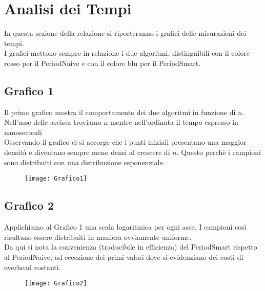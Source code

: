 \chapter{Analisi dei Tempi}
In questa sezione della relazione si riporteranno i grafici delle misurazioni dei tempi.
\\I grafici mettono sempre in relazione i due algoritmi, distinguibili con il colore rosso per il PeriodNaive e con il colore blu per il PeriodSmart.


\section{Grafico 1}
Il primo grafico mostra il comportamento dei due algoritmi in funzione di $n$.\\
Nell'asse delle ascissa troviamo n mentre nell'ordinata il tempo espresso in nanosecondi
\\Osservando il grafico ci si accorge che i punti iniziali presentano una maggior densità e diventano sempre meno densi al crescere di $n$. Questo perchè i campioni sono distribuiti con una distribuzione esponenziale.
\begin{figure}[h!]
    \begin{center}
        \texttt{[image: Grafico1]}\\
    \end{center}
\end{figure}
\pagebreak


\section{Grafico 2}
Applichiamo al Grafico 1 una scala logaritmica per ogni asse. I campioni così risultano essere distribuiti in maniera ovviamente uniforme.
\\Da qui si nota la convenienza (traducibile in efficienza) del PeriodSmart rispetto al PeriodNaive, ad eccezione dei primi valori dove si evidenziano dei costi di overhead costanti.
\begin{figure}[h!]
    \begin{center}
        \texttt{[image: Grafico2]}\\
    \end{center}
\end{figure}


